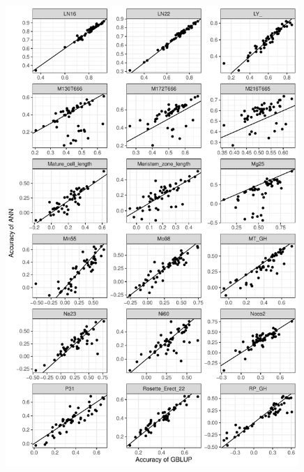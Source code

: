 \begin{figure}[H]
  \centering \includegraphics[height=0.99\textheight, width=0.99\textwidth]{Figures/gray_cor_plots_5}
  \decoRule
 \label{fig:bla}
\end{figure}

